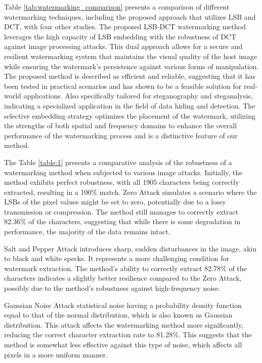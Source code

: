 \documentclass{ieeeaccess}
\begin{document}
Table \ref{tab:watermarking_comparison} presents a comparison of different watermarking techniques, including the proposed approach that utilizes LSB and DCT, with four other studies. The proposed LSB-DCT watermarking method leverages the high capacity of LSB embedding with the robustness of DCT against image processing attacks. This dual approach allows for a secure and resilient watermarking system that maintains the visual quality of the host image while ensuring the watermark's persistence against various forms of manipulation. The proposed method is described as efficient and reliable, suggesting that it has been tested in practical scenarios and has shown to be a feasible solution for real-world applications. Also specifically tailored for steganography and steganalysis, indicating a specialized application in the field of data hiding and detection. The selective embedding strategy optimizes the placement of the watermark, utilizing the strengths of both spatial and frequency domains to enhance the overall performance of the watermarking process and is a distinctive feature of our method.



The Table \ref{table:1} presents a comparative analysis of the robustness of a watermarking method when subjected to various image attacks. Initially, the method exhibits perfect robustness, with all 1905 characters being correctly extracted, resulting in a 100\% match.
Zero Attack simulates a scenario where the LSBs
of the pixel values might be set to zero, potentially due to a lossy transmission or compression. The method still manages to correctly extract 82.36\% of the characters, suggesting that while there is some degradation in performance, the majority of the data remains intact.

Salt and Pepper Attack introduces sharp, sudden disturbances in the image, akin to black and white specks. It represents a more challenging condition for watermark extraction. The method's ability to correctly extract 82.78\% of the characters indicates a slightly better resilience compared to the Zero Attack, possibly due to the method's robustness against high-frequency noise.

Gaussian Noise Attack statistical noise having a probability density function equal to that of the normal distribution, which is also known as Gaussian distribution. This attack affects the watermarking method more significantly, reducing the correct character extraction rate to 81.28\%. This suggests that the method is somewhat less effective against this type of noise, which affects all pixels in a more uniform manner.
\end{document}
